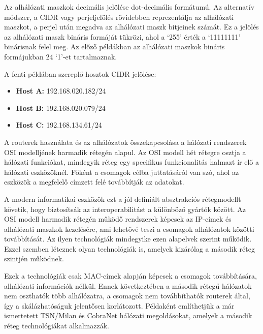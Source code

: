 Az alhálózati maszkok decimális jelölése dot-decimális formátumú. Az alternatív
módszer, a CIDR vagy perjeljelölés rövidebben reprezentálja az alhálózati maszkot,
a perjel után megadva az alhálózati maszk bitjeinek számát. Ez a jelölés az
alhálózati maszk bináris formáját tükrözi, ahol a `255' érték a `11111111'
binárisnak felel meg. Az előző példákban az alhálózati maszkok bináris formájukban
24 `1'-et tartalmaznak.

A fenti példában szereplő hosztok CIDR jelölése:

\begin{itemize}
    \item \textbf{Host A:} 192.168.020.182/24
    \item \textbf{Host B:} 192.168.020.079/24
    \item \textbf{Host C:} 192.168.134.61/24
\end{itemize}

A routerek használata és az alhálózatok összekapcsolása a hálózati rendszerek OSI modelljének harmadik rétegén alapul. 
Az OSI modell hét rétegre osztja a hálózati funkciókat, mindegyik réteg egy specifikus funkcionalitás halmazt ír elő a hálózati eszközöknél. 
Főként a csomagok célba juttatásáról van szó, ahol az eszközök a megfelelő címzett felé továbbítják az adatokat.

A modern informatikai eszközök ezt a jól definiált absztrakciós rétegmodellt követik, hogy biztosítsák az 
interoperabilitást a különböző gyártók között. Az OSI modell harmadik rétegén működő rendszerek képesek az 
IP-címek és alhálózati maszkok kezelésére, ami lehetővé teszi a csomagok alhálózatok közötti továbbítását. 
Az ilyen technológiák mindegyike ezen alapelvek szerint működik. Ezzel szemben léteznek olyan technológiák is, 
amelyek kizárólag a második réteg szintjén működnek.

Ezek a technológiák csak MAC-címek alapján képesek a csomagok továbbítására, alhálózati információk nélkül. 
Ennek következtében a második rétegű hálózatok nem oszthatók több alhálózatra, a csomagok nem továbbíthatók 
routerek által, így a skálázhatóságuk jelentősen korlátozott. Példaként említhetjük a már ismertetett 
TSN/Milan és CobraNet hálózati megoldásokat, amelyek a második réteg technológiákat alkalmazzák.

